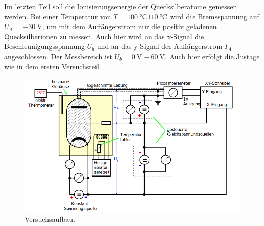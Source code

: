 Im letzten Teil soll die Ionisierungsenergie der Quecksilberatome gemessen werden. Bei einer Temperatur von $T= \SI{100}{\celsius}\SI{110}{\celsius}$ wird die Bremsspannung auf
$U_A = \SI{-30}{\volt}$, um mit dem Auffängerstrom nur die positiv geladenen Quecksilberionen zu messen. Auch hier wird an das x-Signal die Beschleunigungsspannung $U_b$ und
an das y-Signal der Auffängerstrom $I_A$ angeschlossen. Der Messbereich ist $U_b = \SI{0}{\volt}-\SI{60}{\volt}$. Auch hier erfolgt die Justage wie in dem ersten Versuchsteil.

\begin{figure}
  \centering
  \includegraphics[scale=0.5]{Aufbau.png}
  \caption{Versuchsaufbau.\cite{Q1}}
  \label{abb:4}
\end{figure}
